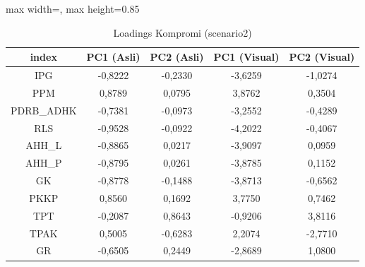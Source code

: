 \begin{table}[H]
\centering
\caption{Loadings Kompromi (scenario2)} \label{tab:app2loadings}
\begin{adjustbox}{max width=\textwidth, max height=0.85\textheight}
\begin{tabular}{|c|c|c|c|c|}
\hline
\textbf{index} & \textbf{PC1 (Asli)} & \textbf{PC2 (Asli)} & \textbf{PC1 (Visual)} & \textbf{PC2 (Visual)} \\
\hline
IPG & -0,8222 & -0,2330 & -3,6259 & -1,0274 \\
PPM & 0,8789 & 0,0795 & 3,8762 & 0,3504 \\
PDRB\_ADHK & -0,7381 & -0,0973 & -3,2552 & -0,4289 \\
RLS & -0,9528 & -0,0922 & -4,2022 & -0,4067 \\
AHH\_L & -0,8865 & 0,0217 & -3,9097 & 0,0959 \\
AHH\_P & -0,8795 & 0,0261 & -3,8785 & 0,1152 \\
GK & -0,8778 & -0,1488 & -3,8713 & -0,6562 \\
PKKP & 0,8560 & 0,1692 & 3,7750 & 0,7462 \\
TPT & -0,2087 & 0,8643 & -0,9206 & 3,8116 \\
TPAK & 0,5005 & -0,6283 & 2,2074 & -2,7710 \\
GR & -0,6505 & 0,2449 & -2,8689 & 1,0800 \\
\hline
\end{tabular}
\end{adjustbox}
\end{table}
